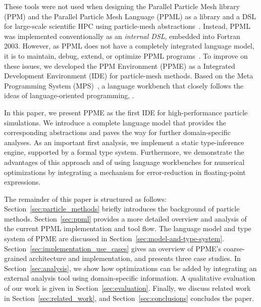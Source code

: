 These tools were not used when designing the Parallel Particle Mesh library (PPM) and the Parallel Particle Mesh Language
(PPML) as a library and a DSL for large-scale scientific HPC using particle-mesh
abstractions~\cite{Sbalzarini2006a,Sbalzarini:2010,Awile:2013,Awile:2013a}. Instead, PPML was
implemented conventionally as an \emph{internal DSL}, embedded into Fortran 2003.
However, as PPML does not have a completely integrated language model, it is
 to maintain, debug, extend, or optimize PPML
programs~\cite{Karol2015a}. To improve on these issues, we developed the PPM
Environment (PPME) as a Integrated Development Environment (IDE) for particle-mesh methods.
Based on the Meta Programming System (MPS)~\cite{Dmitriev2004,MPS32UsersGuide}, a language workbench that closely
follows the ideas of language-oriented programming, . 

In this paper, we present PPME as the first IDE for high-performance particle
simulations.  We introduce a complete language model that provides the corresponding
abstractions and paves the way for further domain-specific analyses. As an
important first analysis, we implement a static type-inference engine, supported
by a formal type system. Furthermore, we demonstrate the advantages of this 
approach and of using language workbenches for numerical optimizations by integrating a
mechanism for error-reduction in floating-point expressions. 

The remainder of this paper is structured as follows: Section~\ref{sec:particle_methods} briefly introduces the background of particle
methods. 
Section~\ref{sec:ppml} provides a more detailed overview and analysis of the current
PPML implementation and tool flow. The language model and type system of PPME are 
discussed in Section~\ref{sec:model-and-type-system}. Section~\ref{sec:implementation_use_cases}
gives an overview of PPME's coarse-grained architecture and implementation, and 
presents three case studies. In Section~\ref{sec:analysis}, we show how optimizations
can be added by integrating an external analysis tool using domain-specific information.
A qualitative evaluation of our work is given in Section~\ref{sec:evaluation}.
Finally, we discuss related work in Section~\ref{sec:related_work}, and Section~\ref{sec:conclusions} 
concludes the paper.




